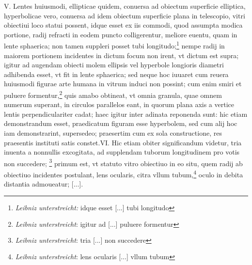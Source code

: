 \pend \pstart [p.~157] V. Lentes\protect{} huiusmodi, ellipticae quidem, conuersa ad obiectum superficie elliptica, hyperbolicae vero, conuersa ad idem obiectum superficie plana in telescopio\protect{}, vitri obiectiui\protect{} loco statui possent, idque esset ex iis commodi, quod assumpta modica portione, radij refracti\protect{} in eodem puncto colligerentur, meliore euentu, quam in lente sphaerica\protect{}; non tamen suppleri posset tubi longitudo;\footnote{\textit{Leibniz unterstreicht:} idque esset [...] tubi longitudo} nempe radij in maiorem portionem incidentes in dictum focum\protect{} non irent, vt dictum est supra; igitur ad augendam obiecti molem ellipsis vel hyperbole longioris diametri adhibenda esset, vt fit in lente sphaerica\protect{}; sed neque hoc iuuaret cum reuera huiusmodi figurae arte humana in vitrum induci non possint; cum enim smiri et puluere formentur,\footnote{\textit{Leibniz unterstreicht}: igitur ad [...] puluere formentur} quis amabo obtineat, vt omnia granula, quae omnem numerum superant, in circulos parallelos eant, in quorum plana axis a vertice lentis\protect{} perpendiculariter cadat; haec igitur inter adinata reponenda sunt: hic etiam demonstrandum esset, praedicatum figuram esse hyperbolem, sed cum alij hoc iam demonstrarint, supersedeo; praesertim cum ex sola constructione, res praesentis instituti satis constet.\pend \pstart VI. Hic etiam obiter significandum videtur, tria inuenta a nonnullis excogitata, ad supplendam tuborum longitudinem pro votis non succedere; \footnote{\textit{Leibniz unterstreicht}: tria [...] non succedere} primum est, vt statuto vitro obiectiuo\protect{} in eo situ, quem radij ab obiectiuo\protect{} incidentes postulant, lens ocularis\protect{}, citra vllum tubum,\footnote{\textit{Leibniz unterstreicht}: lens ocularis [...] vllum tubum} oculo\protect{} in debita distantia admoueatur; [...].